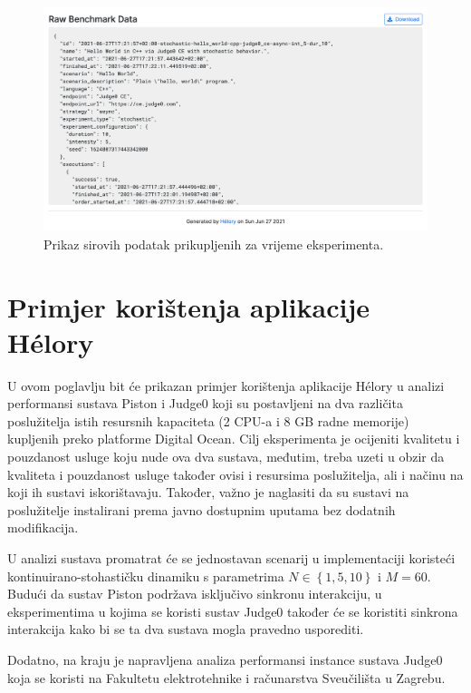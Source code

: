 \documentclass[times, utf8, diplomski]{fer}
\begin{document}
\begin{figure}[htb]
	\centering
	\includegraphics[width=\textwidth]{images/Report UI 4.png}
	\caption{
		Prikaz sirovih podatak prikupljenih za vrijeme eksperimenta.
	}
	\label{fig:report-raw-data}
\end{figure}

\chapter{Primjer korištenja aplikacije Hélory}
\label{chap:use}
U ovom poglavlju bit će prikazan primjer korištenja aplikacije Hélory u analizi performansi sustava Piston i Judge0 koji su postavljeni na dva različita poslužitelja istih resursnih kapaciteta (2 CPU-a i 8 GB radne memorije) kupljenih preko platforme Digital Ocean. Cilj eksperimenta je ocijeniti kvalitetu i pouzdanost usluge koju nude ova dva sustava, međutim, treba uzeti u obzir da kvaliteta i pouzdanost usluge također ovisi i resursima poslužitelja, ali i načinu na koji ih sustavi iskorištavaju. Također, važno je naglasiti da su sustavi na poslužitelje instalirani prema javno dostupnim uputama bez dodatnih modifikacija.

U analizi sustava promatrat će se jednostavan scenarij u  implementaciji koristeći kontinuirano-stohastičku dinamiku s parametrima $N \in \left\{1,5,10\right\}$ i $M=60$. Budući da sustav Piston podržava isključivo sinkronu interakciju, u eksperimentima u kojima se koristi sustav Judge0 također će se koristiti sinkrona interakcija kako bi se ta dva sustava mogla pravedno usporediti.

Dodatno, na kraju je napravljena analiza performansi instance sustava Judge0 koja se koristi na Fakultetu elektrotehnike i računarstva Sveučilišta u Zagrebu.
\end{document}
